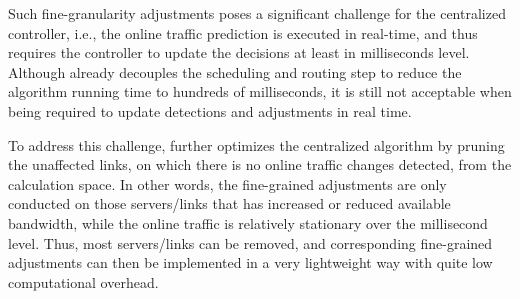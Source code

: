 {
Such fine-granularity adjustments poses a significant challenge for the centralized controller, i.e., the online traffic prediction is executed in real-time, and thus requires the controller to update the decisions at least in milliseconds level. Although \name already decouples the scheduling and routing step to reduce the algorithm running time to hundreds of milliseconds, it is still not acceptable when being required to update detections and adjustments in real time.

To address this challenge, \newname further optimizes the centralized algorithm by pruning the unaffected links, on which there is no online traffic changes detected, from the calculation space. In other words, the fine-grained adjustments are only conducted on those servers/links that has increased or reduced available bandwidth, while the online traffic is relatively stationary over the millisecond level. Thus, most servers/links can be removed, and corresponding fine-grained adjustments can then be implemented in a very lightweight way with quite low computational overhead.

}
